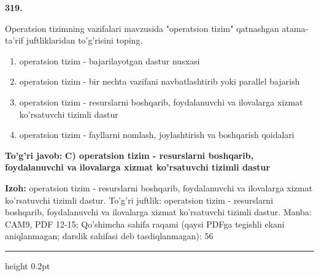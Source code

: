 \documentclass[10pt,a4paper]{article}
\begin{document}
{\bfseries\sffamily\color{ink} 319.}
\par
Operatsion tizimning vazifalari mavzusida "operatsion tizim" qatnashgan atama-ta'rif juftliklaridan to'g'risini toping.
\begin{enumerate}[label=\Alph*),leftmargin=9mm]
\item operatsion tizim - bajarilayotgan dastur nusxasi
\item operatsion tizim - bir nechta vazifani navbatlashtirib yoki parallel bajarish
\item operatsion tizim - resurslarni boshqarib, foydalanuvchi va ilovalarga xizmat ko'rsatuvchi tizimli dastur
\item operatsion tizim - fayllarni nomlash, joylashtirish va boshqarish qoidalari
\end{enumerate}
\begin{tcolorbox}[enhanced,breakable,colback=teal!4,colframe=teal!60!black,boxrule=0.45pt,arc=1.2mm,left=2.7mm,right=2.7mm,top=1.8mm,bottom=1.8mm,before skip=2mm,after skip=2mm]
{\bfseries\sffamily\color{teal}To'g'ri javob:} \textbf{C) operatsion tizim - resurslarni boshqarib, foydalanuvchi va ilovalarga xizmat ko'rsatuvchi tizimli dastur}
\par\smallskip
{\bfseries Izoh:} operatsion tizim - resurslarni boshqarib, foydalanuvchi va ilovalarga xizmat ko'rsatuvchi tizimli dastur. To'g'ri juftlik: operatsion tizim - resurslarni boshqarib, foydalanuvchi va ilovalarga xizmat ko'rsatuvchi tizimli dastur. Manba: CAM9, PDF 12-15; Qo'shimcha sahifa raqami (qaysi PDFga tegishli ekani aniqlanmagan; darslik sahifasi deb tasdiqlanmagan): 56
\end{tcolorbox}
\vspace{2mm}\hrule height 0.2pt\vspace{3mm}
\end{document}
